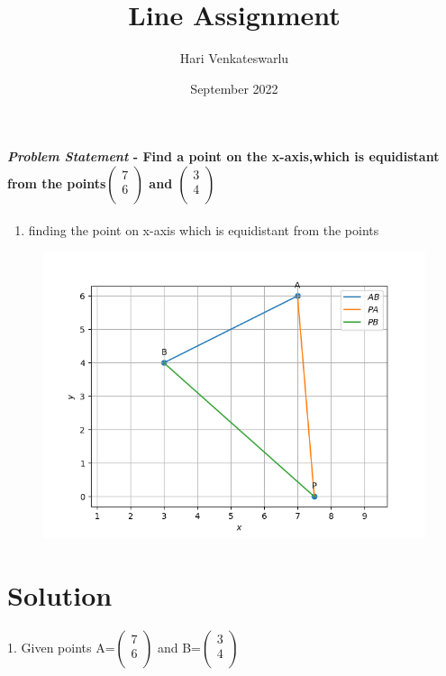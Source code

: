 \documentclass[journal,10pt,twocolumn]{article}
\title{\textbf{Line Assignment}}
\author{Hari Venkateswarlu}
\date{September 2022}
\begin{document}
\maketitle
\paragraph{\textit{Problem Statement} - Find a point on the x-axis,which is equidistant from the points$\begin{pmatrix}
  7 \\
  6 \\
 \end{pmatrix}$ and $\begin{pmatrix}
  3 \\
  4 \\
 \end{pmatrix}$}
\begin{enumerate}
\item finding the point on x-axis which is equidistant from the points
\end{enumerate}

\begin{figure}[h]
\centering
\includegraphics[width=1\columnwidth]{Figure1.png}

\label{fig}
\end{figure}

\section*{Solution}
1. Given points
A=$\begin{pmatrix}
  7 \\
  6 \\
 \end{pmatrix}$
 and B=$\begin{pmatrix}
  3 \\
  4 \\
 \end{pmatrix}$
\end{document}
